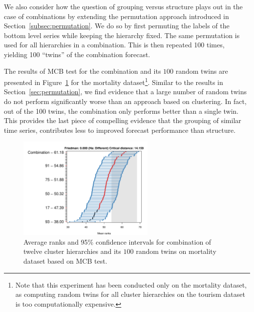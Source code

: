 \documentclass[a4paper,review,12pt,authoryear]{elsarticle}
\begin{document}
We also consider how the question of grouping versus structure plays out in the case of combinations by extending the permutation approach introduced in Section~\ref{subsec:permutation}. We do so by first permuting the labels of the bottom level series while keeping the hierarchy fixed. The same permutation is used for all hierarchies in a combination. This is then repeated 100 times, yielding 100 ``twins'' of the combination forecast.



The results of MCB test for the combination and its $100$ random twins are presented in Figure~\ref{fig:P4_a_vs_pa} for the mortality dataset\footnote{Note that this experiment has been conducted only on the mortality dataset, as computing random twins for all cluster hierarchies on the tourism dataset is too computationally expensive.}.
Similar to the results in Section~\ref{sec:permutation}, we find evidence that a large number of random twins do not perform significantly worse than an approach based on clustering. In fact, out of the 100 twins, the combination only performs better than a single twin. This provides the last piece of compelling evidence that the grouping of similar time series, contributes less to improved forecast performance than structure.

\begin{figure}[h!]
    \centering
    \includegraphics[width=0.6\textwidth]{figures/hierarchy_rmsse/mortality/P4_average_vs_pa_h12.pdf}
    \vspace{-0.1in}\caption{\label{fig:P4_a_vs_pa} Average ranks and 95\% confidence intervals for combination of twelve cluster hierarchies and its $100$ random twins on mortality dataset based on MCB test.}
\end{figure}
\end{document}
